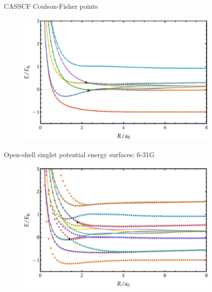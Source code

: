 \documentclass[10pt]{beamer}
\begin{document}
\begin{frame}{CASSCF Coulson-Fisher points}
  \begin{figure}
    \includegraphics[width=0.9\textwidth]{Figures/fig_6b.pdf}
  \end{figure}
\end{frame}

\begin{frame}{Open-shell singlet potential energy surfaces:  6-31G}
  \begin{figure}
    \includegraphics[width=0.9\textwidth]{Figures/fig_7a.pdf}
  \end{figure}
\end{frame}
\end{document}
